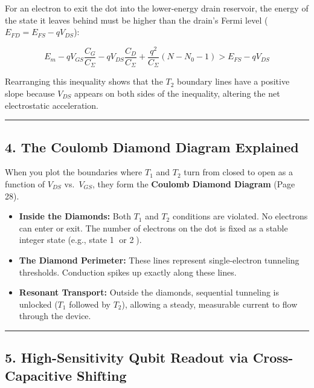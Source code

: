 \documentclass[
]{article}
\providecommand{\tightlist}{%
  \setlength{\itemsep}{0pt}\setlength{\parskip}{0pt}}
\begin{document}
For an electron to exit the dot into the lower-energy drain reservoir,
the energy of the state it leaves behind must be higher than the drain's
Fermi level (\(E_{FD} = E_{FS} - qV_{DS}\)):

\[E_m - q V_{GS}\frac{C_G}{C_{\Sigma}} - q V_{DS}\frac{C_D}{C_{\Sigma}} + \frac{q^2}{C_{\Sigma}}(N - N_0 - 1) > E_{FS} - qV_{DS}\]

Rearranging this inequality shows that the \(T_2\) boundary lines have a
positive slope because \(V_{DS}\) appears on both sides of the
inequality, altering the net electrostatic acceleration.

\begin{center}\rule{0.5\linewidth}{0.5pt}\end{center}

\subsection{4. The Coulomb Diamond Diagram
Explained}\label{the-coulomb-diamond-diagram-explained}

When you plot the boundaries where \(T_1\) and \(T_2\) turn from closed
to open as a function of \(V_{DS}\) vs.~\(V_{GS}\), they form the
\textbf{Coulomb Diamond Diagram} (Page 28).

\begin{itemize}
\tightlist
\item
  \textbf{Inside the Diamonds:} Both \(T_1\) and \(T_2\) conditions are
  violated. No electrons can enter or exit. The number of electrons on
  the dot is fixed as a stable integer state (e.g., state \textcircled{1} or \textcircled{2}).
\item
  \textbf{The Diamond Perimeter:} These lines represent single-electron
  tunneling thresholds. Conduction spikes up exactly along these lines.
\item
  \textbf{Resonant Transport:} Outside the diamonds, sequential
  tunneling is unlocked (\(T_1\) followed by \(T_2\)), allowing a
  steady, measurable current to flow through the device.
\end{itemize}

\begin{center}\rule{0.5\linewidth}{0.5pt}\end{center}

\subsection{5. High-Sensitivity Qubit Readout via Cross-Capacitive
Shifting}\label{high-sensitivity-qubit-readout-via-cross-capacitive-shifting}
\end{document}
